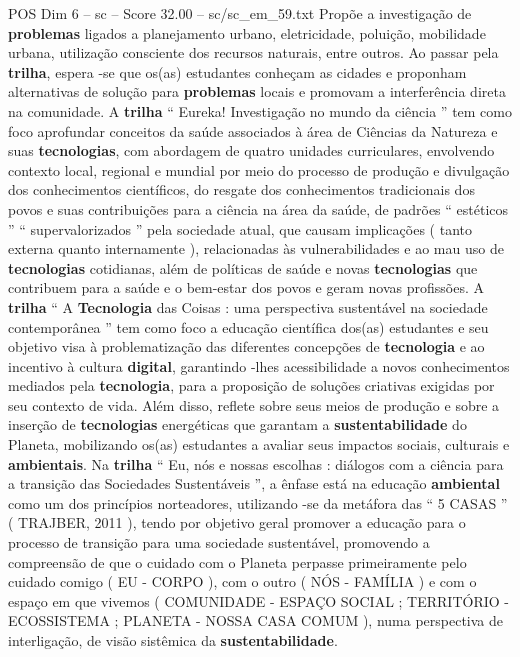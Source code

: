 \begin{textsample}{POS Dim 6 – sc – Score 32.00 – sc/sc\_em\_59.txt}
Propõe a investigação de \textbf{problemas} ligados a planejamento urbano, eletricidade, poluição, mobilidade urbana, utilização consciente dos recursos naturais, entre outros.
Ao passar pela \textbf{trilha}, espera -se que os(as) estudantes conheçam as cidades e proponham alternativas de solução para \textbf{problemas} locais e promovam a interferência direta na comunidade.
A \textbf{trilha} “ Eureka!
Investigação no mundo da ciência ” tem como foco aprofundar conceitos da saúde associados à área de Ciências da Natureza e suas \textbf{tecnologias}, com abordagem de quatro unidades curriculares, envolvendo contexto local, regional e mundial por meio do processo de produção e divulgação dos conhecimentos científicos, do resgate dos conhecimentos tradicionais dos povos e suas contribuições para a ciência na área da saúde, de padrões “ estéticos ” “ supervalorizados ” pela sociedade atual, que causam implicações ( tanto externa quanto internamente ), relacionadas às vulnerabilidades e ao mau uso de \textbf{tecnologias} cotidianas, além de políticas de saúde e novas \textbf{tecnologias} que contribuem para a saúde e o bem-estar dos povos e geram novas profissões.
A \textbf{trilha} “ A \textbf{Tecnologia} das Coisas : uma perspectiva sustentável na sociedade contemporânea ” tem como foco a educação científica dos(as) estudantes e seu objetivo visa à problematização das diferentes concepções de \textbf{tecnologia} e ao incentivo à cultura \textbf{digital}, garantindo -lhes acessibilidade a novos conhecimentos mediados pela \textbf{tecnologia}, para a proposição de soluções criativas exigidas por seu contexto de vida.
Além disso, reflete sobre seus meios de produção e sobre a inserção de \textbf{tecnologias} energéticas que garantam a \textbf{sustentabilidade} do Planeta, mobilizando os(as) estudantes a avaliar seus impactos sociais, culturais e \textbf{ambientais}.
Na \textbf{trilha} “ Eu, nós e nossas escolhas : diálogos com a ciência para a transição das Sociedades Sustentáveis ”, a ênfase está na educação \textbf{ambiental} como um dos princípios norteadores, utilizando -se da metáfora das “ 5 CASAS ” ( TRAJBER, 2011 ), tendo por objetivo geral promover a educação para o processo de transição para uma sociedade sustentável, promovendo a compreensão de que o cuidado com o Planeta perpasse primeiramente pelo cuidado comigo ( EU - CORPO ), com o outro ( NÓS - FAMÍLIA ) e com o espaço em que vivemos ( COMUNIDADE - ESPAÇO SOCIAL ; TERRITÓRIO - ECOSSISTEMA ; PLANETA - NOSSA CASA COMUM ), numa perspectiva de interligação, de visão sistêmica da \textbf{sustentabilidade}.

\end{textsample}
